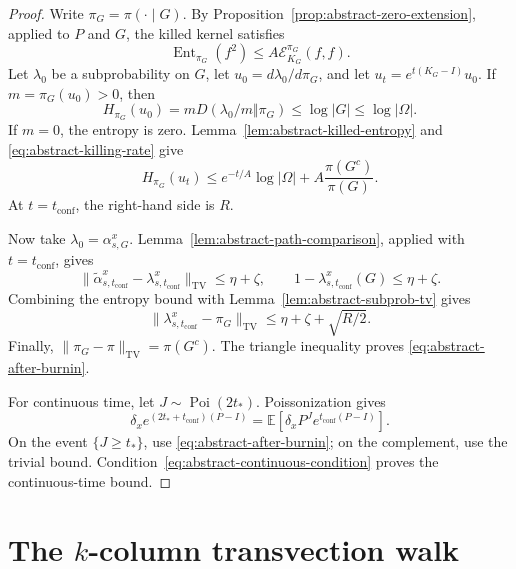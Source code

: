 \documentclass[11pt, reqno]{amsart}
\numberwithin{equation}{section}
\newcommand{\Ent}{\operatorname{Ent}}
\newcommand{\TV}{\mathrm{TV}}
\newcommand{\E}{\mathbb E}
\newcommand{\cE}{\mathcal E}
\begin{document}
\begin{proof}
Write \(\pi_G=\pi(\cdot\mid G)\).  By
Proposition~\ref{prop:abstract-zero-extension}, applied to \(P\) and \(G\),
the killed kernel satisfies
\[
    \Ent_{\pi_G}(f^2)\le A\cE_{K_G}^{\pi_G}(f,f).
\]
Let \(\lambda_0\) be a subprobability on \(G\), let
\(u_0=d\lambda_0/d\pi_G\), and let \(u_t=e^{t(K_G-I)}u_0\).  If
\(m=\pi_G(u_0)>0\), then
\[
    H_{\pi_G}(u_0)=mD(\lambda_0/m\Vert\pi_G)
    \le \log |G|\le\log|\Omega|.
\]
If \(m=0\), the entropy is zero.  Lemma~\ref{lem:abstract-killed-entropy} and
\eqref{eq:abstract-killing-rate} give
\[
    H_{\pi_G}(u_t)
    \le e^{-t/A}\log|\Omega|+A\frac{\pi(G^c)}{\pi(G)}.
\]
At \(t=t_{\mathrm{conf}}\), the right-hand side is \(R\).

Now take \(\lambda_0=\alpha_{s,G}^x\).  Lemma~\ref{lem:abstract-path-comparison},
applied with \(t=t_{\mathrm{conf}}\), gives
\[
    \|\widetilde\alpha_{s,t_{\mathrm{conf}}}^x
      -\lambda_{s,t_{\mathrm{conf}}}^x\|_{\TV}\le \eta+\zeta,
    \qquad
    1-\lambda_{s,t_{\mathrm{conf}}}^x(G)\le\eta+\zeta.
\]
Combining the entropy bound with Lemma~\ref{lem:abstract-subprob-tv} gives
\[
    \|\lambda_{s,t_{\mathrm{conf}}}^x-\pi_G\|_{\TV}
    \le \eta+\zeta+\sqrt{R/2}.
\]
Finally, \(\|\pi_G-\pi\|_{\TV}=\pi(G^c)\).  The triangle inequality proves
\eqref{eq:abstract-after-burnin}.

For continuous time, let \(J\sim\operatorname{Poi}(2t_*)\).  Poissonization gives
\[
    \delta_x e^{(2t_*+t_{\mathrm{conf}})(P-I)}
    =\E\left[\delta_xP^J e^{t_{\mathrm{conf}}(P-I)}\right].
\]
On the event \(\{J\ge t_*\}\), use \eqref{eq:abstract-after-burnin}; on the complement,
use the trivial bound.  Condition~\eqref{eq:abstract-continuous-condition}
proves the continuous-time bound.
\end{proof}




\section{The \texorpdfstring{$k$}{k}-column transvection walk}\label{sec:transvection}
\end{document}
